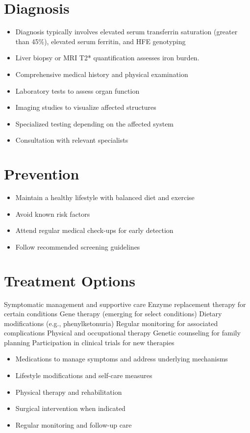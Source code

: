\section{Diagnosis}
\begin{itemize}[noitemsep]
  \item Diagnosis typically involves elevated serum transferrin saturation (greater than 45\%), elevated serum ferritin, and HFE genotyping
  \item Liver biopsy or MRI T2* quantification assesses iron burden.
  \item Comprehensive medical history and physical examination
  \item Laboratory tests to assess organ function
  \item Imaging studies to visualize affected structures
  \item Specialized testing depending on the affected system
  \item Consultation with relevant specialists
\end{itemize}
\section{Prevention}
\begin{itemize}[noitemsep]
  \item Maintain a healthy lifestyle with balanced diet and exercise
  \item Avoid known risk factors
  \item Attend regular medical check-ups for early detection
  \item Follow recommended screening guidelines
\end{itemize}
\section{Treatment Options}
Symptomatic management and supportive care Enzyme replacement therapy for certain conditions Gene therapy (emerging for select conditions) Dietary modifications (e.g., phenylketonuria) Regular monitoring for associated complications Physical and occupational therapy Genetic counseling for family planning Participation in clinical trials for new therapies

\begin{itemize}[noitemsep]
  \item Medications to manage symptoms and address underlying mechanisms
  \item Lifestyle modifications and self-care measures
  \item Physical therapy and rehabilitation
  \item Surgical intervention when indicated
  \item Regular monitoring and follow-up care
\end{itemize}
